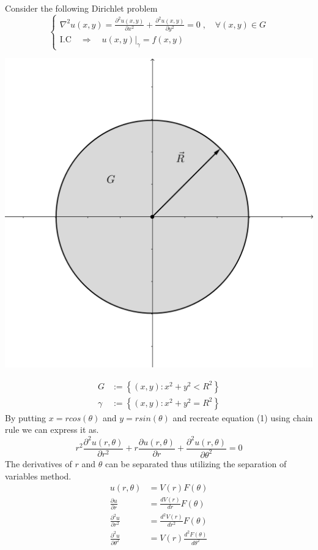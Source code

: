 \documentclass[]{article}
\begin{document}
Consider the following Dirichlet problem
\begin{equation}
    \begin{cases}
        \displaystyle \nabla^2 u(x,y) = \frac{\partial^2 u(x,y)}{\partial x^2} + \frac{\partial^2 u(x,y)}{\partial y^2} = 0\;, \quad \forall (x,y) \in G
        \\
        \text{I.C} \quad \Longrightarrow \quad u(x,y)|_\gamma = f(x,y)
    \end{cases}
\end{equation}
\begin{center}
\includegraphics[scale=0.14]{circle.png}
\end{center}
\begin{align*}
G &:= \left\lbrace (x,y):x^2+y^2 < R^2 \right\rbrace
\\
\gamma &:= \left\lbrace (x,y):x^2+y^2 = R^2 \right\rbrace
\end{align*}
By putting $x = r cos(\theta)$ and $y = r sin(\theta)$ and recreate equation (1) using chain rule we can express it as.
\[
    r^2 \frac{\partial^2 u(r,\theta)}{\partial r^2} + r \frac{\partial u(r,\theta)}{\partial r} + \frac{\partial^2 u(r,\theta)}{\partial \theta^2} = 0    
\]
The derivatives of $r$ and $\theta$ can be separated thus utilizing the separation of variables method.
\begin{align*}
u(r,\theta) &= V(r)F(\theta)
\\
\frac{\partial u}{\partial r} &= \frac{d V(r)}{dr}F(\theta)
\\
\frac{\partial^2 u}{\partial r^2} &= \frac{d^2 V(r)}{dr^2}F(\theta)
\\
\frac{\partial^2 u}{\partial \theta^2} &= V(r)\frac{d^2 F(\theta)}{d\theta^2}
\end{align*}
\end{document}
